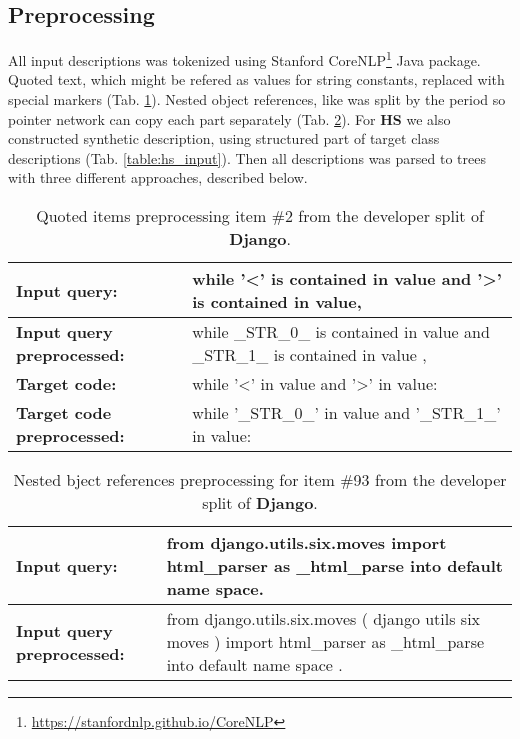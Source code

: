 
\subsection{Preprocessing} \label{preprocessing}

All input descriptions was tokenized using Stanford CoreNLP\footnote{\href{https://stanfordnlp.github.io/CoreNLP}{https://stanfordnlp.github.io/CoreNLP}} Java package. Quoted text, which might be refered as values for string constants, replaced with special markers (Tab. \ref{table:str_markers}). Nested object references, like  was split by the period so pointer network can copy each part separately (Tab. \ref{table:function_calls}). For \textbf{HS} we also constructed synthetic description, using structured part of target class descriptions (Tab. \ref{table:hs_input}). Then all descriptions was parsed to trees with three different approaches, described below.

\begin{table}
\begin{tabularx}{\textwidth}{ l X }
\hline
\textbf{Input query:} & while '<' is contained in value and '>' is contained in value, \\
\hline 
\textbf{Input query preprocessed:} & while \_STR\_0\_ is contained in value and \_STR\_1\_ is contained in value , \\
\hline 
\textbf{Target code:} & while '<' in value and '>' in value: \\
\hline 
\textbf{Target code preprocessed:} & while '\_STR\_0\_' in value and '\_STR\_1\_' in value: \\
\hline
\end{tabularx}
\caption[Quoted items preprocessing]{Quoted items preprocessing item \#2 from the developer split of \textbf{Django}.}
\label{table:str_markers}
\end{table}

\begin{table}
\begin{tabularx}{\textwidth}{ l X }
\hline
\textbf{Input query:} & from django.utils.six.moves import html\_parser as \_html\_parse into default name space. \\
\hline 
\textbf{Input query preprocessed:} & from django.utils.six.moves ( django utils six moves ) import html\_parser as \_html\_parse into default name space . \\
\hline 
\end{tabularx}
\caption[Nested object references preprocessing]{Nested bject references preprocessing for item \#93 from the developer split of \textbf{Django}.}
\label{table:function_calls}
\end{table}

